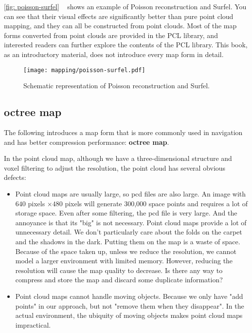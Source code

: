 \autoref{fig: poisson-surfel} ~ shows an example of Poisson reconstruction and Surfel. You can see that their visual effects are significantly better than pure point cloud mapping, and they can all be constructed from point clouds. Most of the map forms converted from point clouds are provided in the PCL library, and interested readers can further explore the contents of the PCL library. This book, as an introductory material, does not introduce every map form in detail.

\begin{figure}[! htp]
\centering
\texttt{[image: mapping/poisson-surfel.pdf]}
\caption{Schematic representation of Poisson reconstruction and Surfel. }
\label{fig: poisson-surfel}
\end{figure}

\subsection{octree map}
The following introduces a map form that is more commonly used in navigation and has better compression performance: \textbf{octree map}.

In the point cloud map, although we have a three-dimensional structure and voxel filtering to adjust the resolution, the point cloud has several obvious defects:

\begin{itemize}
\item Point cloud maps are usually large, so pcd files are also large. An image with $ 640 $ pixels $ \times480 $ pixels will generate 300,000 space points and requires a lot of storage space. Even after some filtering, the pcd file is very large. And the annoyance is that its "big" is not necessary. Point cloud maps provide a lot of unnecessary detail. We don't particularly care about the folds on the carpet and the shadows in the dark. Putting them on the map is a waste of space. Because of the space taken up, unless we reduce the resolution, we cannot model a larger environment with limited memory. However, reducing the resolution will cause the map quality to decrease. Is there any way to compress and store the map and discard some duplicate information?
\item Point cloud maps cannot handle moving objects. Because we only have "add points" in our approach, but not "remove them when they disappear". In the actual environment, the ubiquity of moving objects makes point cloud maps impractical.
\end{itemize}

